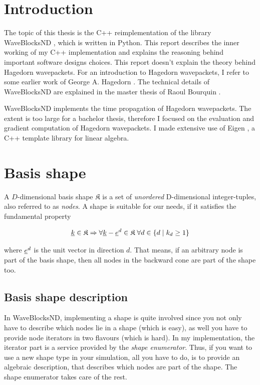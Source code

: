 \documentclass{article}
\begin{document}


\tableofcontents
\clearpage

\section{Introduction}
The topic of this thesis is the C++ reimplementation of the library WaveBlocksND
\cite{waveblocksnd}, which is written in Python.
This report describes the inner working of my C++ implementation
and explains the reasoning behind important software designs choices.
This report doesn't explain the theory behind Hagedorn wavepackets.
For an introduction to Hagedorn wavepackets, I refer to some earlier work
of George A. Hagedorn \cite{H_ladder_operators}.
The technical details of WaveBlocksND are explained
in the master thesis of Raoul Bourquin \cite{B_master_thesis}.

WaveBlocksND implements the time propagation of Hagedorn wavepackets.
The extent is too large for a bachelor thesis, therefore I focused on the
evaluation and gradient computation of Hagedorn wavepackets.
I made extensive use of Eigen \cite{eigenweb}, a C++ template library for linear algebra.

\section{Basis shape}

A \(D\)-dimensional basis shape \(\mathfrak{K}\)
is a set of \emph{unordered} D-dimensional integer-tuples, also
referred to as \emph{nodes}.  A shape is suitable for our needs, if it
satisfies the fundamental property

\begin{equation}
  \label{eq:basis_shape_fundamental_property}
  \underline{k} \in \mathfrak{K} \Rightarrow \forall
  \underline{k}-\underline{e}^d \in \mathfrak{K} \;\forall d \in \{d \;|\;k_d \geq 1\}
\end{equation}

where \(\underline{e}^d\) is the unit vector in direction \(d\).
That means, if an arbitrary node is part of the basis shape, then all nodes
in the backward cone are part of the shape too.

\subsection{Basis shape description}
In WaveBlocksND, implementing a shape is quite involved since you
not only have to describe which nodes lie in a shape (which is easy),
as well you have to provide node iterators in two flavours (which is hard).
In my implementation, the iterator part is a service provided by the
\emph{shape enumerator}. Thus, if you want to use a new shape type in your simulation,
all you have to do, is to provide an algebraic description, that describes
which nodes are part of the shape. The shape enumerator takes care of the rest.
\end{document}
